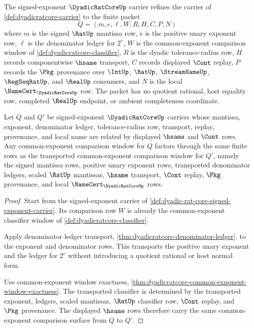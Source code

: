 \begin{definition}
\label{def:dyadic-rat-core-signed-exponent-carrier}
The signed-exponent $\DyadicRatCoreUp$ carrier refines the carrier of \autoref{def:dyadicratcore-carrier} to the finite packet
$$
Q=(m,e,\ell,W,R,H,C,P,N)
$$
where $m$ is the signed $\RatUp$ mantissa row, $e$ is the positive unary exponent row, $\ell$ is the denominator ledger for $2^e$, $W$ is the common-exponent comparison window of \autoref{def:dyadicratcore-classifier}, $R$ is the dyadic tolerance-radius row, $H$ records componentwise $\hsame$ transport, $C$ records displayed $\Cont$ replay, $P$ records the $\Pkg$ provenance over $\IntUp$, $\RatUp$, $\StreamNameUp$, $\RegSeqRatUp$, and $\RealUp$ consumers, and $N$ is the local $\NameCert_{\DyadicRatCoreUp}$ row. The packet has no quotient rational, host equality row, completed $\RealUp$ endpoint, or ambient completeness coordinate.
\end{definition}

\begin{theorem}
\label{thm:dyadic-rat-core-common-exponent-stability}
Let $Q$ and $Q'$ be signed-exponent $\DyadicRatCoreUp$ carriers whose mantissa, exponent, denominator ledger, tolerance-radius row, transport, replay, provenance, and local name are related by displayed $\hsame$ and $\Cont$ rows. Any common-exponent comparison window for $Q$ factors through the same finite rows as the transported common-exponent comparison window for $Q'$, namely the signed mantissa rows, positive unary exponent rows, transported denominator ledgers, scaled $\RatUp$ mantissas, $\hsame$ transport, $\Cont$ replay, $\Pkg$ provenance, and local $\NameCert_{\DyadicRatCoreUp}$ rows.
\end{theorem}
\begin{proof}
Start from the signed-exponent carrier of \autoref{def:dyadic-rat-core-signed-exponent-carrier}. Its comparison row $W$ is already the common-exponent classifier window of \autoref{def:dyadicratcore-classifier}.

Apply denominator ledger transport, \autoref{thm:dyadicratcore-denominator-ledger}, to the exponent and denominator rows. This transports the positive unary exponent and the ledger for $2^e$ without introducing a quotient rational or host normal form.

Use common-exponent window exactness, \autoref{thm:dyadicratcore-common-exponent-window-exactness}. The transported classifier is determined by the transported exponent, ledgers, scaled mantissas, $\RatUp$ classifier row, $\Cont$ replay, and $\Pkg$ provenance. The displayed $\hsame$ rows therefore carry the same common-exponent comparison surface from $Q$ to $Q'$.
\end{proof}

